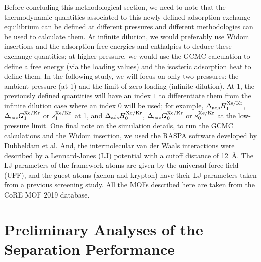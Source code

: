 \documentclass[main.tex]{subfiles}
\begin{document}
Before concluding this methodological section, we need to note that the thermodynamic quantities associated to this newly defined adsorption exchange equilibrium can be defined at different pressures and different methodologies can be used to calculate them. At infinite dilution, we would preferably use Widom insertions and the adsorption free energies and enthalpies to deduce these exchange quantities; at higher pressure, we would use the GCMC calculation to define a free energy (via the loading values) and the isosteric adsorption heat to define them. In the following study, we will focus on only two pressures: the ambient pressure (at \SI{1}{\atm}) and the limit of zero loading (infinite dilution). At \SI{1}{\atm}, the previously defined quantities will have an index $1$ to differentiate them from the infinite dilution case where an index $0$ will be used; for example, $\Delta_{\text{ads}}H_{\text{1}}^{\text{Xe/Kr}}$, $\Delta_{\text{exc}}G_{\text{1}}^{\text{Xe/Kr}}$ or $s_{\text{1}}^{\text{Xe/Kr}}$ at \SI{1}{\atm}, and $\Delta_{\text{ads}}H_{\text{0}}^{\text{Xe/Kr}}$, $\Delta_{\text{exc}}G_{\text{0}}^{\text{Xe/Kr}}$ or $s_{\text{0}}^{\text{Xe/Kr}}$ at the low-pressure limit. One final note on the simulation details, to run the GCMC calculations and the Widom insertion, we used the RASPA software developed by Dubbeldam et al.\autocite{dubbeldam2016} And, the intermolecular van der Waals interactions were described by a Lennard-Jones (LJ) potential with a cutoff distance of \SI{12}{\angstrom}. The LJ parameters of the framework atoms are given by the universal force field (UFF),\autocite{rappe1992} and the guest atoms (xenon and krypton) have their LJ parameters taken from a previous screening study.\autocite{Ryan_2010} All the MOFs described here are taken from the CoRE MOF 2019 database.\autocite{Chung_2019}


\section{Preliminary Analyses of the Separation Performance}
\end{document}
